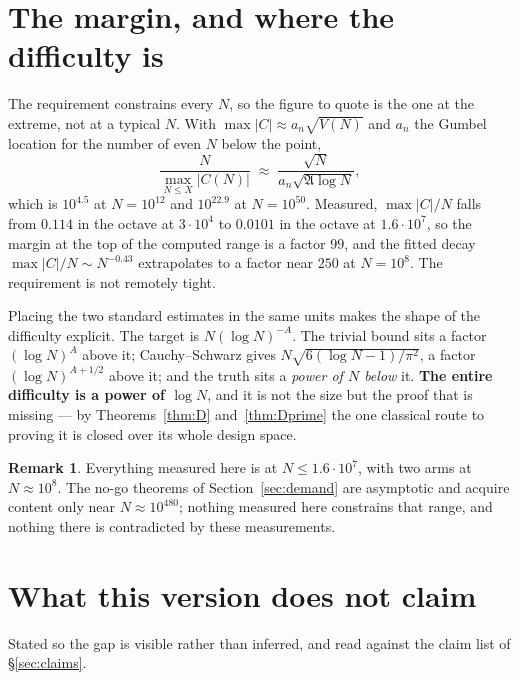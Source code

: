 \documentclass[11pt,a4paper]{article}
\theoremstyle{plain}
\theoremstyle{definition}
\newtheorem{remark}[theorem]{Remark}
\newcommand{\AAA}{\mathfrak{A}}
\begin{document}
\section{The margin, and where the difficulty is}

The requirement constrains every $N$, so the figure to quote is the one
at the extreme, not at a typical $N$. With $\max|C|\approx
a_n\sqrt{V(N)}$ and $a_n$ the Gumbel location for the number of even
$N$ below the point,
\[
  \frac{N}{\max_{N\le X}|C(N)|}\;\approx\;
  \frac{\sqrt N}{a_n\sqrt{\AAA\log N}},
\]
which is $10^{4.5}$ at $N=10^{12}$ and $10^{22.9}$ at $N=10^{50}$.
Measured, $\max|C|/N$ falls from $0.114$ in the octave at
$3\cdot10^4$ to $0.0101$ in the octave at $1.6\cdot10^7$, so the margin
at the top of the computed range is a factor $99$, and the fitted decay
$\max|C|/N \sim N^{-0.43}$ extrapolates to a factor near $250$ at
$N=10^8$. The requirement is not remotely tight.

Placing the two standard estimates in the same units makes the shape of
the difficulty explicit. The target is $N(\log N)^{-A}$. The trivial
bound sits a factor $(\log N)^{A}$ above it; Cauchy--Schwarz gives
$N\sqrt{6(\log N-1)/\pi^2}$, a factor $(\log N)^{A+1/2}$ above it; and
the truth sits a \emph{power of $N$ below} it. \textbf{The entire
difficulty is a power of $\log N$}, and it is not the size but the
proof that is missing --- by Theorems~\ref{thm:D} and~\ref{thm:Dprime}
the one classical route to proving it is closed over its whole design
space.

\begin{remark}
Everything measured here is at $N\le1.6\cdot10^7$, with two arms at
$N\approx10^8$. The no-go theorems of Section~\ref{sec:demand} are
asymptotic and acquire content only near $N\approx10^{480}$; nothing
measured here constrains that range, and nothing there is contradicted
by these measurements.
\end{remark}

\section{What this version does not claim}\label{sec:notclaimed}

Stated so the gap is visible rather than inferred, and read against the
claim list of \S\ref{sec:claims}.
\end{document}
